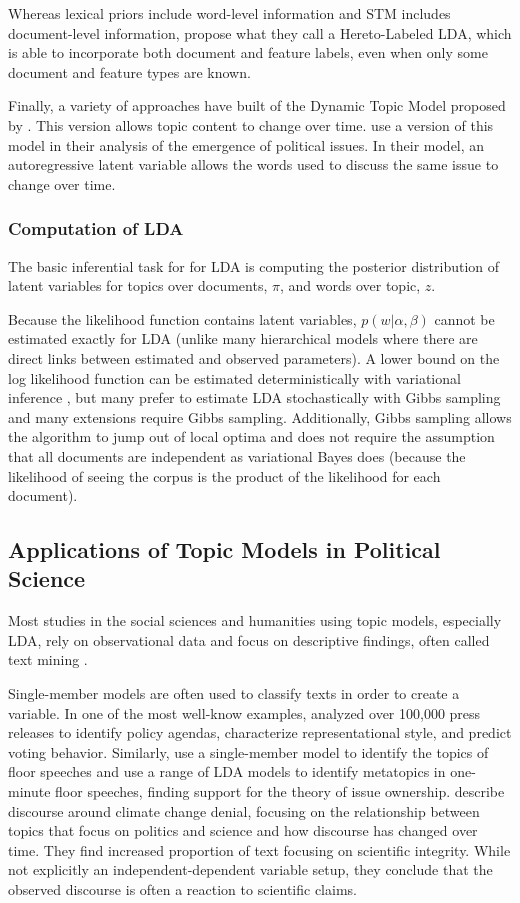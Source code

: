 \documentclass{article}
\begin{document}
Whereas lexical priors include word-level information and STM includes document-level information, \citet{Kang2014} propose what they call a Hereto-Labeled LDA, which is able to incorporate both document and feature labels, even when only some document and feature types are known. 


Finally, a variety of approaches have built of the Dynamic Topic Model proposed by \citet{Blei2006}. This version allows topic content to change over time. \citet{Brookhart2015}  use a version of this model in their analysis of the emergence of political issues. In their model, an autoregressive latent variable allows the words used to discuss the same issue to change over time. 


\subsubsection{Computation of LDA}
The basic inferential task for for LDA is computing the posterior distribution of latent variables for topics over documents, $\pi$, and words over topic, $z$. 


Because the likelihood function contains latent variables, $p(w|\alpha, \beta)$ cannot be estimated exactly for LDA (unlike many hierarchical models where there are direct links between estimated and observed parameters). A lower bound on the log likelihood function can be estimated deterministically with variational inference \citep{Blei2003}, but many prefer to estimate LDA stochastically with Gibbs sampling and many extensions require Gibbs sampling. Additionally, Gibbs sampling allows the algorithm to jump out of local optima and does not require the assumption that all documents are independent as variational Bayes does (because the likelihood of seeing the corpus is the product of the likelihood for each document). 


\subsection{Applications of Topic Models in Political Science}
Most studies in the social sciences and humanities using topic models, especially LDA, rely on observational data and focus on descriptive findings, often called text mining \citep{Srivastava2009}.

Single-member models are often used to classify texts in order to create a variable. In one of the most well-know examples,\citet{Grimmer2010} analyzed over 100,000 press releases to identify policy agendas, characterize representational style, and predict voting behavior. Similarly, \citet{Quinn2010} use a single-member model to identify the topics of floor speeches and \citet{Wilkerson2016} use a range of LDA models to identify metatopics in one-minute floor speeches, finding support for the theory of issue ownership. 
\citet{Boussalis2016} describe discourse around climate change denial, focusing on the relationship between topics that focus on politics and science and how discourse has changed over time. They find increased proportion of text focusing on scientific integrity. While not explicitly an independent-dependent variable setup, they conclude that the observed discourse is often a reaction to scientific claims. 
\end{document}

